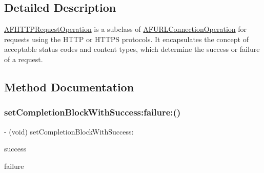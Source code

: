 \subsection{Detailed Description}
{\ttfamily \mbox{\hyperlink{interface_a_f_h_t_t_p_request_operation}{A\+F\+H\+T\+T\+P\+Request\+Operation}}} is a subclass of {\ttfamily \mbox{\hyperlink{interface_a_f_u_r_l_connection_operation}{A\+F\+U\+R\+L\+Connection\+Operation}}} for requests using the H\+T\+TP or H\+T\+T\+PS protocols. It encapsulates the concept of acceptable status codes and content types, which determine the success or failure of a request. 

\subsection{Method Documentation}
\mbox{\label{interface_a_f_h_t_t_p_request_operation_a3b816391726dade9cfc9cbc11cc352d6}} 
\subsubsection{\texorpdfstring{set\+Completion\+Block\+With\+Success\+:failure\+:()}{setCompletionBlockWithSuccess:failure:()}\hspace{0.1cm}{\footnotesize\ttfamily [1/3]}}
{\footnotesize\ttfamily -\/ (void) set\+Completion\+Block\+With\+Success\+: \begin{DoxyParamCaption}\item[{(nullable void($^\wedge$)(\mbox{\hyperlink{interface_a_f_h_t_t_p_request_operation}{A\+F\+H\+T\+T\+P\+Request\+Operation}} $\ast$operation, id \mbox{\hyperlink{interface_a_f_h_t_t_p_request_operation_a7418f7784dcaf21623ce588fb27734c3}{response\+Object}}))}]{success }\item[{failure:(nullable void($^\wedge$)(\mbox{\hyperlink{interface_a_f_h_t_t_p_request_operation}{A\+F\+H\+T\+T\+P\+Request\+Operation}} $\ast$operation, N\+S\+Error $\ast$\mbox{\hyperlink{interface_a_f_u_r_l_connection_operation_a51f90be47e7f7577b979aae1aa597070}{error}}))}]{failure }\end{DoxyParamCaption}}

